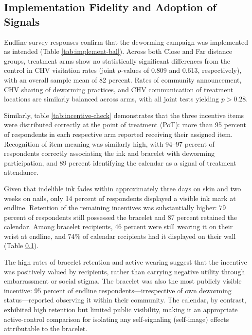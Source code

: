 \subsection{Implementation Fidelity and Adoption of Signals} %



\label{tab:incentive_check_smscontrol}
Endline survey responses confirm that the deworming campaign was implemented as intended
(Table \ref{tab:implement-bal}). Across both Close and Far distance groups, treatment arms
show no statistically significant differences from the control in CHV visitation rates
(joint $p$-values of 0.809 and 0.613, respectively), with an overall sample mean of 82
percent. Rates of community announcement, CHV sharing of deworming practices, and CHV
communication of treatment locations are similarly balanced across arms, with all joint
tests yielding $p > 0.28$.


Similarly, table \ref{tab:incentive-check} demonstrates that the three incentive items were distributed correctly at the point of treatment (PoT): more than 95 percent 
of respondents in each respective arm reported receiving their assigned item. Recognition of 
item meaning was similarly high, with 94–97 percent of respondents correctly associating the 
ink and bracelet with deworming participation, and 89 percent identifying the calendar 
as a signal of treatment attendance.

Given that indelible ink fades within approximately three days on skin and two weeks on nails, 
only 14 percent of respondents displayed a visible ink mark at endline. Retention of the 
remaining incentives was substantially higher: 79 percent of respondents still possessed the 
bracelet and 87 percent retained the calendar. Among bracelet recipients, 46 percent were still 
wearing it on their wrist at endline, and 74\% of calendar recipients had it displayed on their 
wall (Table \ref{tab:incentive_check_smscontrol}).

The high rates of bracelet retention and active wearing suggest that the incentive was 
positively valued by recipients, rather than carrying negative utility through embarrassment 
or social stigma. The bracelet was also the most publicly visible incentive: 95 percent of 
endline respondents—irrespective of own deworming status—reported observing it within their 
community. The calendar, by contrast, exhibited high retention but limited public visibility, 
making it an appropriate active-control comparison for isolating any self-signaling 
(self-image) effects attributable to the bracelet.


